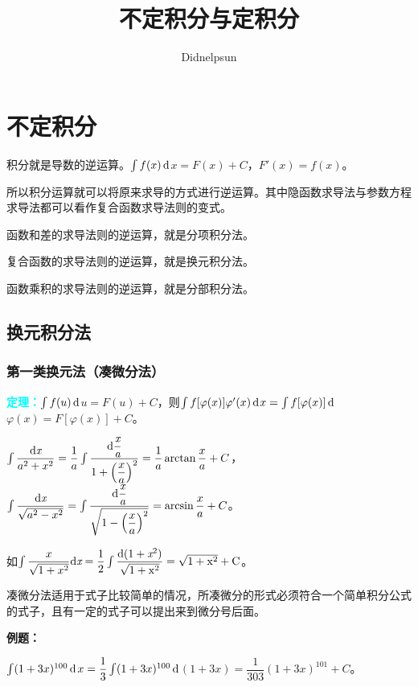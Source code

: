 \documentclass[UTF8, 12pt]{ctexart}
\author{Didnelpsun}
\title{不定积分与定积分}
\date{}
\begin{document}
\maketitle
\pagestyle{empty}
\thispagestyle{empty}
\tableofcontents
\thispagestyle{empty}
\newpage
\pagestyle{plain}
\setcounter{page}{1}
\section{不定积分}

积分就是导数的逆运算。$\int f(x)\,\rm{d}$$x=F(x)+C$，$F'(x)=f(x)$。 

所以积分运算就可以将原来求导的方式进行逆运算。其中隐函数求导法与参数方程求导法都可以看作复合函数求导法则的变式。

函数和差的求导法则的逆运算，就是分项积分法。

复合函数的求导法则的逆运算，就是换元积分法。

函数乘积的求导法则的逆运算，就是分部积分法。

\subsection{换元积分法}

\subsubsection{第一类换元法（凑微分法）}

\textcolor{aqua}{\textbf{定理：}}$\int f(u)\,\rm{d}$$u=F(u)+C$，则$\int f[\varphi(x)]\varphi'(x)\,\rm{d}$$x=\int f[\varphi(x)]\,\rm{d}$$\varphi(x)=F[\varphi(x)]+C$。

$\int\dfrac{\rm{d}\textit{x}}{a^2+x^2}=\dfrac{1}{a}\int\dfrac{\rm{d}\dfrac{\textit{x}}{\textit{a}}}{1+\left(\dfrac{x}{a}\right)^2}=\dfrac{1}{a}\arctan\dfrac{x}{a}+C$，$\int\dfrac{\rm{d}\textit{x}}{\sqrt{a^2-x^2}}=\int\dfrac{\rm{d}\dfrac{\textit{x}}{\textit{a}}}{\sqrt{1-\left(\dfrac{x}{a}\right)^2}}=\arcsin\dfrac{x}{a}+C$。

如$\int\dfrac{x}{\sqrt{1+x^2}}\rm{d}\textit{x}=\dfrac{1}{2}\int\dfrac{\rm{d}(1+\textit{x}^2)}{\sqrt{1+x^2}}=\sqrt{1+x^2}+C$。\medskip

凑微分法适用于式子比较简单的情况，所凑微分的形式必须符合一个简单积分公式的式子，且有一定的式子可以提出来到微分号后面。

\textbf{例题：}

$\int(1+3x)^{100}\,\rm{d}$$x=\dfrac{1}{3}\int(1+3x)^{100}\,\rm{d}$$(1+3x)=\dfrac{1}{303}(1+3x)^{101}+C$。
\end{document}
